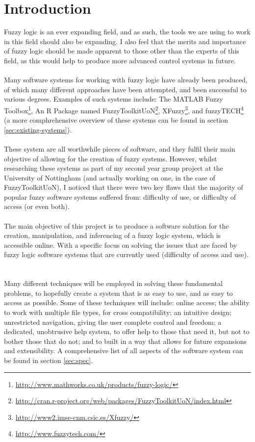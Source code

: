\section{Introduction}
Fuzzy logic is an ever expanding field, and as such, the tools we are using to work in this field should also be expanding. I also feel that the merits and importance of fuzzy logic should be made apparent to those other than the experts of this field, as this would help to produce more advanced control systems in future.\ \\
\ \\
Many software systems for working with fuzzy logic have already been produced, of which many different approaches have been attempted, and been successful to various degrees. Examples of such systems include: The MATLAB Fuzzy Toolbox\footnote{\url{http://www.mathworks.co.uk/products/fuzzy-logic/}}, An R Package named  FuzzyToolkitUoN\footnote{\url{http://cran.r-project.org/web/packages/FuzzyToolkitUoN/index.html}}, XFuzzy\footnote{\url{http://www2.imse-cnm.csic.es/Xfuzzy/}}, and fuzzyTECH\footnote{\url{http://www.fuzzytech.com/}} (a more comphrehensive overview of these systems can be found in section \ref{sec:existing-systems}).\ \\
\ \\
These system are all worthwhile pieces of software, and they fulfil their main objective of allowing for the creation of fuzzy systems. However, whilst researching these systems as part of my second year group project at the University of Nottingham (and actually working on one, in the case of FuzzyToolkitUoN), I noticed that there were two key flaws that the majority of popular fuzzy software systems suffered from: difficulty of use, or difficulty of access (or even both). \ \\
\ \\
The main objective of this project is to produce a software solution for the creation, manipulation, and inferencing of a fuzzy logic system, which is accessible online. With a specific focus on solving the issues that are faced by fuzzy logic software systems that are currently used (difficulty of access and use). \ \\
\ \\
Many different techniques will be employed in solving these fundamental problems, to hopefully create a system that is as easy to use, and as easy to access as possible. Some of these techniques will include: online access; the ability to work with multiple file types, for cross compatibility; an intuitive design; unrestricted navigation, giving the user complete control and freedom; a dedicated, unobtrusive help system, to offer help to those that need it, but not to bother those that do not; and to built in a way that allows for future expansions and extensibility. A comprehensive list of all aspects of the software system can be found in section \ref{sec:spec}.\ \\
